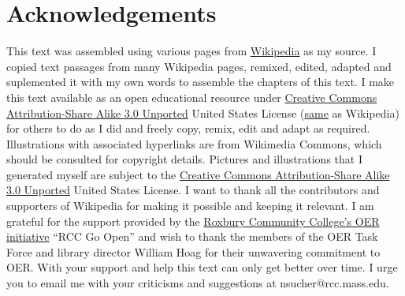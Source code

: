 \hypertarget{acknowledgements}{%
\section*{Acknowledgements}\label{acknowledgements}}

This text was assembled using various pages from
\href{https://www.wikipedia.org}{Wikipedia} as my source. I copied text
passages from many Wikipedia pages, remixed, edited, adapted and
suplemented it with my own words to assemble the chapters of this text.
I make this text available as an open educational resource under
\href{https://creativecommons.org/licenses/by-sa/3.0/deed.en}{Creative
Commons Attribution-Share Alike 3.0 Unported} United States License
(\href{https://en.wikipedia.org/wiki/Wikipedia:Text_of_Creative_Commons_Attribution-ShareAlike_3.0_Unported_License}{same}
as Wikipedia) for others to do as I did and freely copy, remix, edit and
adapt as required. Illustrations with associated hyperlinks are from
Wikimedia Commons, which should be consulted for copyright details.
Pictures and illustrations that I generated myself are subject to the
\href{https://creativecommons.org/licenses/by-sa/3.0/deed.en}{Creative
Commons Attribution-Share Alike 3.0 Unported} United States License. I
want to thank all the contributors and supporters of Wikipedia for
making it possible and keeping it relevant. I am grateful for the
support provided by the
\href{http://libguides.rcc.mass.edu/OER/proposal}{Roxbury Community
College's OER initiative} ``RCC Go Open'' and wish to thank the members
of the OER Task Force and library director William Hoag for their
unwavering commitment to OER. With your support and help this text can
only get better over time. I urge you to email me with your criticisms
and suggestions at nsucher@rcc.mass.edu.

